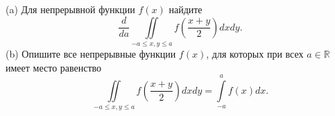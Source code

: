 \documentclass{article}
\begin{document}
(a) Для непрерывной функции $f(x)$ найдите
$$\frac{d}{da} \iint\limits_{-a \leqslant x,y \leqslant a} f \left( \frac{x+y}{2} \right) dx dy.$$
(b) Опишите все непрерывные функции $f(x)$, для которых при всех $a \in \mathbb{R}$ имеет место равенство
$$\iint\limits_{-a \leqslant x,y \leqslant a} f \left( \frac{x+y}{2} \right) dx dy = \int\limits_{-a}^{a} f(x) dx.$$
\end{document}

